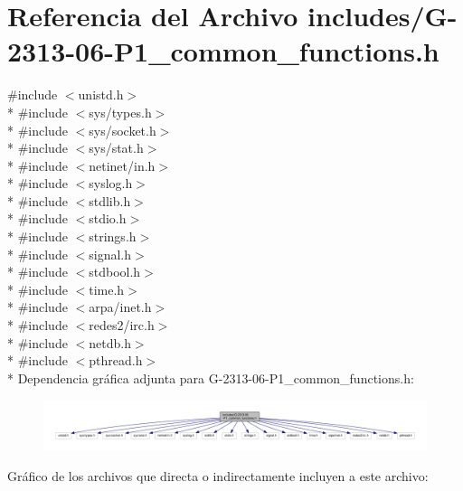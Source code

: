 \hypertarget{G-2313-06-P1__common__functions_8h}{}\section{Referencia del Archivo includes/\+G-\/2313-\/06-\/\+P1\+\_\+common\+\_\+functions.h}
\label{G-2313-06-P1__common__functions_8h}
{\ttfamily \#include $<$unistd.\+h$>$}\\*
{\ttfamily \#include $<$sys/types.\+h$>$}\\*
{\ttfamily \#include $<$sys/socket.\+h$>$}\\*
{\ttfamily \#include $<$sys/stat.\+h$>$}\\*
{\ttfamily \#include $<$netinet/in.\+h$>$}\\*
{\ttfamily \#include $<$syslog.\+h$>$}\\*
{\ttfamily \#include $<$stdlib.\+h$>$}\\*
{\ttfamily \#include $<$stdio.\+h$>$}\\*
{\ttfamily \#include $<$strings.\+h$>$}\\*
{\ttfamily \#include $<$signal.\+h$>$}\\*
{\ttfamily \#include $<$stdbool.\+h$>$}\\*
{\ttfamily \#include $<$time.\+h$>$}\\*
{\ttfamily \#include $<$arpa/inet.\+h$>$}\\*
{\ttfamily \#include $<$redes2/irc.\+h$>$}\\*
{\ttfamily \#include $<$netdb.\+h$>$}\\*
{\ttfamily \#include $<$pthread.\+h$>$}\\*
Dependencia gráfica adjunta para G-\/2313-\/06-\/\+P1\+\_\+common\+\_\+functions.h\+:\nopagebreak
\begin{figure}[H]
\begin{center}
\leavevmode
\includegraphics[width=350pt]{G-2313-06-P1__common__functions_8h__incl}
\end{center}
\end{figure}
Gráfico de los archivos que directa o indirectamente incluyen a este archivo\+:\nopagebreak
